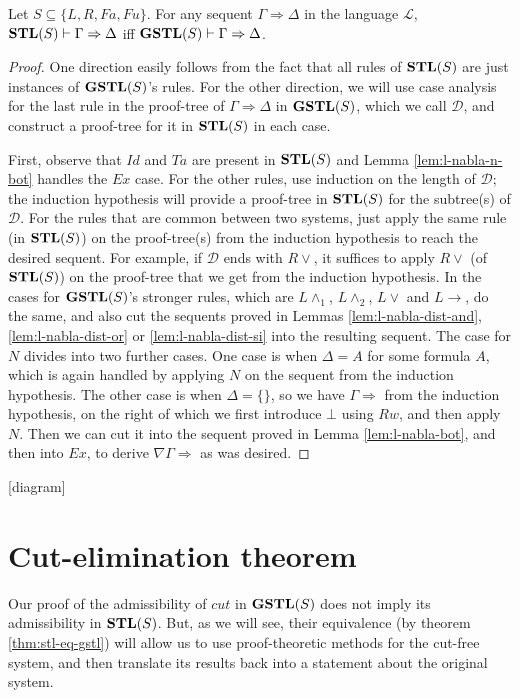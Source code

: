 \documentclass[12pt,a4paper]{article}
\begin{document}
\begin{thm}\label{thm:stl-eq-gstl}
	Let $S \subseteq \{L, R, Fa, Fu\}$. For any sequent $\Gamma \Rightarrow \Delta$ in the language $\mathcal{L}$, $\mathbf{STL}(S) \vdash \Gamma \Rightarrow \Delta$ iff $\mathbf{GSTL}(S) \vdash \Gamma \Rightarrow \Delta$.
\end{thm}
\begin{proof}
	One direction easily follows from the fact that all rules of $\mathbf{STL}(S)$ are just instances of $\mathbf{GSTL}(S)$'s rules.
	For the other direction, we will use case analysis for the last rule in the proof-tree of $\Gamma \Rightarrow \Delta$ in $\mathbf{GSTL}(S)$, which we call $\mathcal{D}$, and construct a proof-tree for it in $\mathbf{STL}(S)$ in each case.
	
	First, observe that $Id$ and $Ta$ are present in $\mathbf{STL}(S)$ and Lemma \ref{lem:l-nabla-n-bot} handles the $Ex$ case.
	For the other rules, use induction on the length of $\mathcal{D}$; the induction hypothesis will provide a proof-tree in $\mathbf{STL}(S)$ for the subtree(s) of $\mathcal{D}$.
	For the rules that are common between two systems, just apply the same rule (in $\mathbf{STL}(S)$) on the proof-tree(s) from the induction hypothesis to reach the desired sequent. For example, if $\mathcal{D}$ ends with $R \vee$, it suffices to apply $R \vee$ (of $\mathbf{STL}(S)$) on the proof-tree that we get from the induction hypothesis.
	In the cases for $\mathbf{GSTL}(S)$'s stronger rules, which are $L \wedge_1$, $L \wedge_2$, $L \vee$ and $L \rightarrow$, do the same, and also cut the sequents proved in Lemmas \ref{lem:l-nabla-dist-and}, \ref{lem:l-nabla-dist-or} or \ref{lem:l-nabla-dist-si} into the resulting sequent.
	The case for $N$ divides into two further cases. One case is when $\Delta = A$ for some formula $A$, which is again handled by applying $N$ on the sequent from the induction hypothesis.
	The other case is when $\Delta = \{\}$, so we have $\Gamma \Rightarrow$ from the induction hypothesis, on the right of which we first introduce $\bot$ using $Rw$, and then apply $N$.
	Then we can cut it into the sequent proved in Lemma \ref{lem:l-nabla-bot}, and then into $Ex$, to derive $\nabla \Gamma \Rightarrow$ as was desired.
\end{proof}

[diagram]

\section{Cut-elimination theorem}
Our proof of the admissibility of $cut$ in $\mathbf{GSTL}(S)$ does not imply its admissibility in $\mathbf{STL}(S)$. But, as we will see, their equivalence (by theorem \ref{thm:stl-eq-gstl}) will allow us to use proof-theoretic methods for the cut-free system, and then translate its results back into a statement about the original system.
\end{document}
